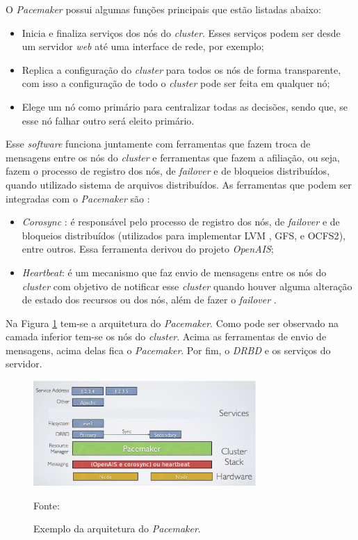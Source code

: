 O \textit{Pacemaker} possui algumas funções principais que estão listadas abaixo:
\begin{itemize}
 \item Inicia e finaliza serviços dos nós do \textit{cluster}. Esses serviços podem ser desde um servidor \textit{web} até uma interface de 
 rede, por exemplo;
 \item Replica a configuração do \textit{cluster} para todos os nós de forma transparente, com isso a configuração de todo o \textit{cluster} 
 pode ser feita em qualquer nó;
 \item Elege um nó como primário para centralizar todas as decisões, sendo que, se esse nó falhar outro será eleito primário.
\end{itemize}

Esse \textit{software} funciona juntamente com ferramentas que fazem troca de mensagens entre os nós do \textit{cluster} e ferramentas que 
fazem a afiliação, ou seja, fazem o processo de registro dos nós, de \textit{failover} e de bloqueios distribuídos, quando utilizado sistema 
de arquivos distribuídos. As ferramentas que podem ser integradas com o \textit{Pacemaker} são \cite{pacemaker}:
\begin{itemize}
 \item \textit{Corosync} \cite{corosync}: é responsável pelo processo de registro dos nós, de \textit{failover} e de bloqueios distribuídos 
 (utilizados para implementar \ac{LVM} \cite{lvm}, \ac{GFS}, e \ac{OCFS2}), entre outros. Essa ferramenta derivou do projeto \textit{OpenAIS};
 \item \textit{Heartbeat}: é um mecanismo que faz envio de mensagens entre os nós do \textit{cluster} com objetivo de notificar esse 
 \textit{cluster} quando houver alguma alteração de estado dos recursos ou dos nós, além de fazer o \textit{failover} \cite{clusterlabs}.
\end{itemize}


Na Figura \ref{fig:pacemaker_tools} tem-se a arquitetura do \textit{Pacemaker}. Como pode ser observado na camada inferior tem-se os nós do 
\textit{cluster}. Acima as ferramentas de envio de mensagens, acima delas fica o \textit{Pacemaker}. Por fim, o \textit{DRBD} e os 
serviços do servidor.

\begin{figure}[h!]
 \centering
 \includegraphics[width=320px]{img/pacemaker_tools.eps}
 \caption{Exemplo da arquitetura do \textit{Pacemaker}.}
 Fonte: \citet{pacemaker}
 \label{fig:pacemaker_tools}
\end{figure}

